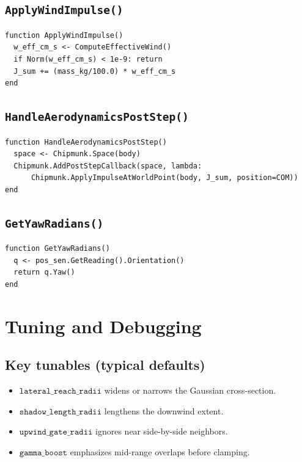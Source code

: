 \documentclass[11pt,a4paper]{article}
\begin{document}
\subsection{\texttt{ApplyWindImpulse()}}
\begin{lstlisting}[language=pseudo]
function ApplyWindImpulse()
  w_eff_cm_s <- ComputeEffectiveWind()
  if Norm(w_eff_cm_s) < 1e-9: return
  J_sum += (mass_kg/100.0) * w_eff_cm_s
end
\end{lstlisting}

\subsection{\texttt{HandleAerodynamicsPostStep()}}
\begin{lstlisting}[language=pseudo]
function HandleAerodynamicsPostStep()
  space <- Chipmunk.Space(body)
  Chipmunk.AddPostStepCallback(space, lambda:
      Chipmunk.ApplyImpulseAtWorldPoint(body, J_sum, position=COM))
end
\end{lstlisting}

\subsection{\texttt{GetYawRadians()}}
\begin{lstlisting}[language=pseudo]
function GetYawRadians()
  q <- pos_sen.GetReading().Orientation()
  return q.Yaw()
end
\end{lstlisting}

\section{Tuning and Debugging}
\subsection*{Key tunables (typical defaults)}
\begin{itemize}
  \item \(\texttt{lateral\_reach\_radii}\) widens or narrows the Gaussian cross-section.
  \item \(\texttt{shadow\_length\_radii}\) lengthens the downwind extent.
  \item \(\texttt{upwind\_gate\_radii}\) ignores near side-by-side neighbors.
  \item \(\texttt{gamma\_boost}\) emphasizes mid-range overlaps before clamping.
\end{itemize}
\end{document}
